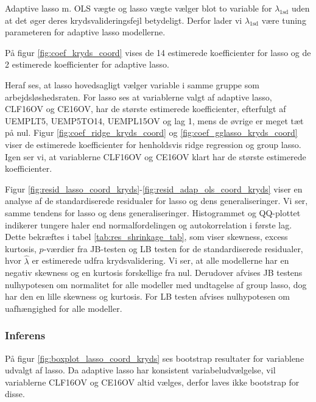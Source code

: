 Adaptive lasso m. OLS vægte og lasso vægte vælger blot to variable for $\lambda_{1\text{sd}}$ uden at det øger deres krydsvalideringsfejl betydeligt. Derfor lader vi $\lambda_{1\text{sd}}$ være tuning parameteren for adaptive lasso modellerne. 

På figur \ref{fig:coef_kryds_coord} vises de 14 estimerede koefficienter for lasso og de 2 estimerede koefficienter for adaptive lasso.

Heraf ses, at lasso hovedsagligt vælger variable i samme gruppe som arbejdsløshedsraten.
For lasso ses at variablerne valgt af adaptive lasso, \textcolor{blue3}{CLF16OV} og \textcolor{blue3}{CE16OV}, har de største estimerede koefficienter, efterfulgt af \textcolor{blue3}{UEMPLT5}, \textcolor{blue3}{UEMP5TO14}, \textcolor{blue3}{UEMPL15OV} og \textcolor{blue3}{lag 1}, mens de øvrige er meget tæt på nul. 
Figur \ref{fig:coef_ridge_kryds_coord} og \ref{fig:coef_gglasso_kryds_coord} viser de estimerede koefficienter for henholdsvis ridge regression og group lasso.
Igen ser vi, at variablerne \textcolor{blue3}{CLF16OV} og \textcolor{blue3}{CE16OV} klart har de største estimerede koefficienter.    
%


Figur \ref{fig:resid_lasso_coord_kryds}-\ref{fig:resid_adap_ols_coord_kryds} viser en analyse af de standardiserede residualer for lasso og dens generaliseringer. 
Vi ser, samme tendens for lasso og dens generaliseringer. Histogrammet og QQ-plottet indikerer tungere haler end normalfordelingen og autokorrelation i første lag.
Dette bekræftes i tabel \ref{tab:res_shrinkage_tab}, som viser skewness, excess kurtosis, $p$-værdier fra JB-testen og LB testen for de standardiserede residualer, hvor $\widehat{\lambda}$ er estimerede udfra krydsvalidering.  
Vi ser, at alle modellerne har en negativ skewness og en kurtosis forskellige fra nul. 
Derudover afvises JB testens nulhypotesen om normalitet for alle modeller med undtagelse af group lasso, dog har den en lille skewness og kurtosis.
For LB testen afvises nulhypotesen om uafhængighed for alle modeller.

\subsubsection{Inferens}
På figur \ref{fig:boxplot_lasso_coord_kryds} ses bootstrap resultater for variablene udvalgt af lasso.
Da adaptive lasso har konsistent variabeludvælgelse, vil variablerne \textcolor{blue3}{CLF16OV} og \textcolor{blue3}{CE16OV} altid vælges, derfor laves ikke bootstrap for disse.

